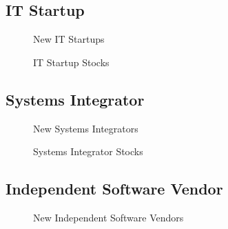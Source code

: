 	\subsection{IT Startup}\label{ch:app05:cs:its}

	\begin{figure}[htb]
		\centering
		
		\caption{New IT Startups}
	\end{figure}

	\begin{figure}[htb]
		\centering
		
		\caption{IT Startup Stocks}
	\end{figure}

	\newpage
	\subsection{Systems Integrator}\label{ch:app05:cs:si}

	\begin{figure}[htb]
		\centering
		
		\caption{New Systems Integrators}
	\end{figure}

	\begin{figure}[htb]
		\centering
		
		\caption{Systems Integrator Stocks}
	\end{figure}

	\newpage
	\subsection{Independent Software Vendor}\label{ch:app05:cs:isv}

	\begin{figure}[htb]
		\centering
		
		\caption{New Independent Software Vendors}
	\end{figure}

